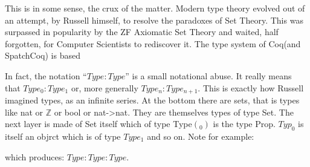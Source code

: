 This is in some sense, the crux of the matter. Modern type theory evolved out of an attempt, 
by Russell himself, to resolve the paradoxes of Set Theory. This was surpassed in popularity by the ZF Axiomatic Set Theory and waited, half forgotten, for Computer Scientists to rediscover it. The type system of Coq(and SpatchCoq) is based 

In fact, the notation ``$Type : Type$'' is a small notational abuse. It really means that $Type_{0} : Type_{1}$ or, more generally $Type_{n} : Type_{n+1}$. This is exactly how Russell imagined types,  as an infinite series. At the bottom there are sets, that is types like nat or $\mathbb{Z}$ or bool or nat->nat. They are themselves types of type Set. The next layer is made of Set itself which of type Type$(_{0})$ is the type Prop. $Typ_{0}$ is itself an objrct which is of type $Type_{1}$ and so on. Note for example:

 which produces:
$Type : Type
     : Type$.